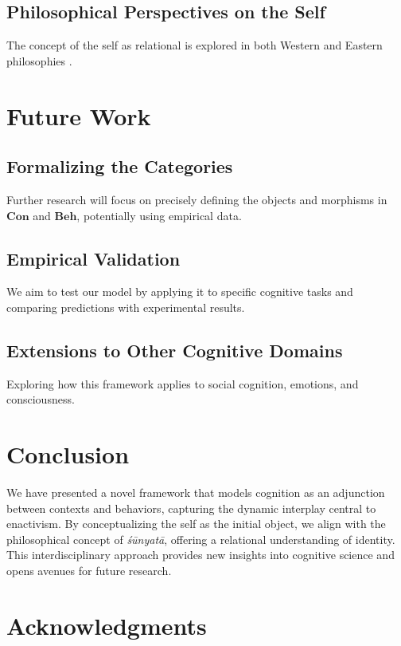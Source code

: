 \documentclass{article}
\begin{document}
\subsection{Philosophical Perspectives on the Self}

The concept of the self as relational is explored in both Western \cite{heidegger1962} and Eastern philosophies \cite{garfield1995}.

\section{Future Work}

\subsection{Formalizing the Categories}

Further research will focus on precisely defining the objects and morphisms in $\mathbf{Con}$ and $\mathbf{Beh}$, potentially using empirical data.

\subsection{Empirical Validation}

We aim to test our model by applying it to specific cognitive tasks and comparing predictions with experimental results.

\subsection{Extensions to Other Cognitive Domains}

Exploring how this framework applies to social cognition, emotions, and consciousness.

\section{Conclusion}

We have presented a novel framework that models cognition as an adjunction between contexts and behaviors, capturing the dynamic interplay central to enactivism. By conceptualizing the self as the initial object, we align with the philosophical concept of \emph{śūnyatā}, offering a relational understanding of identity. This interdisciplinary approach provides new insights into cognitive science and opens avenues for future research.

\section*{Acknowledgments}
\end{document}
